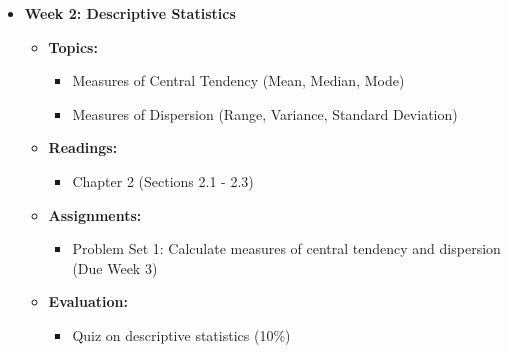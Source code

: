 \documentclass[aspectratio=169]{beamer}
\begin{document}
\begin{frame}[fragile]
\begin{itemize}
        \item \textbf{Week 2: Descriptive Statistics}
        \begin{itemize}
            \item \textbf{Topics:}
                \begin{itemize}
                    \item Measures of Central Tendency (Mean, Median, Mode)
                    \item Measures of Dispersion (Range, Variance, Standard Deviation)
                \end{itemize}
            \item \textbf{Readings:}
                \begin{itemize}
                    \item Chapter 2 (Sections 2.1 - 2.3)
                \end{itemize}
            \item \textbf{Assignments:}
                \begin{itemize}
                    \item Problem Set 1: Calculate measures of central tendency and dispersion (Due Week 3)
                \end{itemize}
            \item \textbf{Evaluation:}
                \begin{itemize}
                    \item Quiz on descriptive statistics (10\%)
                \end{itemize}
        \end{itemize}
        

\end{itemize}
\end{frame}
\end{document}
